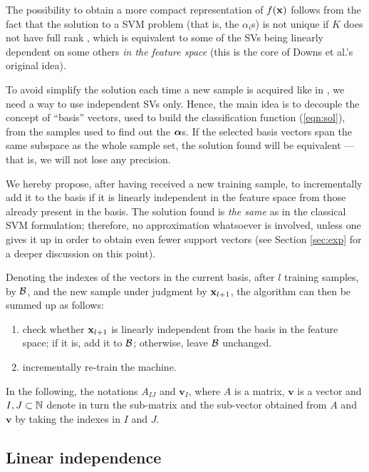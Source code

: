 The possibility to obtain a more compact representation of $f(\xx)$
follows from the fact that the solution to a SVM problem (that is, the
$\alpha_i$s) is not unique if $K$ does not have full rank
\cite{Burges98}, which is equivalent to some of the SVs being linearly
dependent on some others \emph{in the feature space} (this is the core
of Downs et al.'s \cite{DownsGM01} original idea).

To avoid simplify the solution each time a new sample is acquired like
in \cite{DownsGM01}, we need a way to use independent SVs only. Hence,
the main idea is to decouple the concept of ``basis'' vectors, used to
build the classification function (\ref{eqn:sol}), from the samples
used to find out the $\aa$s. If the selected basis vectors span the
same subspace as the whole sample set, the solution found will be
equivalent --- that is, we will not lose any precision.

We hereby propose, after having received a new training sample, to
incrementally add it to the basis if it is linearly independent in the
feature space from those already present in the basis.  The solution
found is \emph{the same} as in the classical SVM formulation;
therefore, no approximation whatsoever is involved, unless one gives
it up in order to obtain even fewer support vectors (see Section
\ref{sec:exp} for a deeper discussion on this point).

Denoting the indexes of the vectors in the current basis, after $l$
training samples, by $\b$, and the new sample under judgment by
$\xx_{l+1}$, the algorithm can then be summed up as follows:

\begin{enumerate}

  \item check whether $\xx_{l+1}$ is linearly independent from the
        basis in the feature space; if it is, add it to $\b$;
        otherwise, leave $\b$ unchanged.

  \item incrementally re-train the machine.

\end{enumerate}

In the following, the notations $A_{IJ}$ and $\mathbf{v}_I$, where $A$
is a matrix, $\mathbf{v}$ is a vector and $I,J \subset \NN$ denote in
turn the sub-matrix and the sub-vector obtained from $A$ and
$\mathbf{v}$ by taking the indexes in $I$ and $J$.

\subsection{Linear independence}


